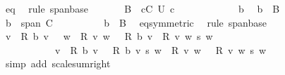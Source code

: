 \begin{isabellebody}
\ eq\ \isamarkupfalse%
\ {\isacharparenleft}{\kern0pt}rule\ span{\isacharunderscore}{\kern0pt}base{\isacharparenright}{\kern0pt}\ \isanewline
\ \ \ \ \isamarkupfalse%
\ {\isacartoucheopen}B\ {\isasymsubseteq}\ {\isacharparenleft}{\kern0pt}{\isasymUnion}c{\isasymin}C{\isachardot}{\kern0pt}\ {\isacharquery}{\kern0pt}U\ c{\isacharparenright}{\kern0pt}{\isacartoucheclose}\isanewline
\ \ \ \ \isamarkupfalse%
\isanewline
\ \ \ \ \ \ \isamarkupfalse%
\ b\ \isamarkupfalse%
\ {\isacartoucheopen}b\ {\isasymin}\ B{\isacartoucheclose}\isanewline
\ \ \ \ \ \ \isamarkupfalse%
\ {\isacartoucheopen}b\ {\isasymin}\ span\ C{\isacartoucheclose}\isanewline
\ \ \ \ \ \ \ \ \isamarkupfalse%
\ {\isacartoucheopen}b\ {\isasymin}\ B{\isacartoucheclose}\ \isamarkupfalse%
\ eq{\isacharbrackleft}{\kern0pt}symmetric{\isacharbrackright}{\kern0pt}\ \isamarkupfalse%
\ {\isacharparenleft}{\kern0pt}rule\ span{\isacharunderscore}{\kern0pt}base{\isacharparenright}{\kern0pt}\isanewline
\ \ \ \ \ \ \isamarkupfalse%
\ {\isacartoucheopen}{\isacharparenleft}{\kern0pt}{\isasymSum}v\ {\isacharbar}{\kern0pt}\ {\isacharquery}{\kern0pt}R{\isacharprime}{\kern0pt}\ b\ v\ {\isasymnoteq}\ {}{\isachardot}{\kern0pt}\ {\isasymSum}w\ {\isacharbar}{\kern0pt}\ {\isacharquery}{\kern0pt}R\ v\ w\ {\isasymnoteq}\ {}{\isachardot}{\kern0pt}\ {\isacharparenleft}{\kern0pt}{\isacharquery}{\kern0pt}R{\isacharprime}{\kern0pt}\ b\ v\ {\isacharasterisk}{\kern0pt}\ {\isacharquery}{\kern0pt}R\ v\ w{\isacharparenright}{\kern0pt}\ {\isacharasterisk}{\kern0pt}s\ w{\isacharparenright}{\kern0pt}\ {\isacharequal}{\kern0pt}\isanewline
\ \ \ \ \ \ \ \ \ \ \ {\isacharparenleft}{\kern0pt}{\isasymSum}v\ {\isacharbar}{\kern0pt}\ {\isacharquery}{\kern0pt}R{\isacharprime}{\kern0pt}\ b\ v\ {\isasymnoteq}\ {}{\isachardot}{\kern0pt}\ {\isacharquery}{\kern0pt}R{\isacharprime}{\kern0pt}\ b\ v\ {\isacharasterisk}{\kern0pt}s\ {\isacharparenleft}{\kern0pt}{\isasymSum}w\ {\isacharbar}{\kern0pt}\ {\isacharquery}{\kern0pt}R\ v\ w\ {\isasymnoteq}\ {}{\isachardot}{\kern0pt}\ {\isacharquery}{\kern0pt}R\ v\ w\ {\isacharasterisk}{\kern0pt}s\ w{\isacharparenright}{\kern0pt}{\isacharparenright}{\kern0pt}{\isacartoucheclose}\isanewline
\ \ \ \ \ \ \ \ \isamarkupfalse%
\ {\isacharparenleft}{\kern0pt}simp\ add{\isacharcolon}{\kern0pt}\ scale{\isacharunderscore}{\kern0pt}sum{\isacharunderscore}{\kern0pt}right{\isacharparenright}{\kern0pt}\isanewline

\end{isabellebody}
